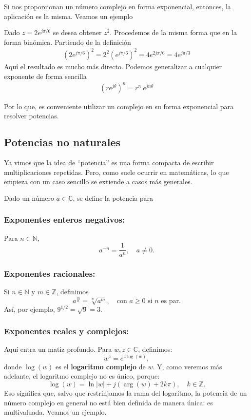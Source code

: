 Si nos proporcionan un número complejo en forma exponencial, entonces, la aplicación es la misma. Veamos un ejemplo
\begin{example}
  Dado $z=2e^{j\pi/6}$ se desea obtener $z^2$. Procedemos de la misma forma que en la forma binómica. Partiendo de la definición
  \begin{align*}
    (2e^{j\pi/6})^2 = 2^2 (e^{j\pi/6})^2 = 4 e^{2j\pi/6} = 4 e^{j\pi/3}
  \end{align*}
  Aquí el resultado es mucho más directo. Podemos generalizar a cualquier exponente de forma sencilla
  \begin{align*}
    (re^{j\theta})^n = r^n ~ e^{jn\theta}
  \end{align*}
\end{example}
Por lo que, es conveniente utilizar un complejo en su forma exponencial para resolver potencias.

\subsection{Potencias no naturales}

Ya vimos que la idea de ``potencia'' es una forma compacta de escribir multiplicaciones repetidas. Pero, como suele ocurrir en matemáticas, lo que empieza con un caso sencillo se extiende a casos más generales. 

Dado un número $a\in\mathbb{C}$, se define la potencia para

\subsubsection{Exponentes enteros negativos:}
Para \(n \in \mathbb{N}\),
\[
a^{-n} = \frac{1}{a^n}, \quad a \neq 0.
\]

\subsubsection{Exponentes racionales:}
Si \(n \in \mathbb{N}\) y \(m \in \mathbb{Z}\), definimos
\[
a^{\tfrac{m}{n}} = \sqrt[n]{a^m}, \quad \text{con } a \geq 0 \text{ si } n \text{ es par}.
\]
Así, por ejemplo, \(9^{1/2} = \sqrt{9} = 3\).

\subsubsection{Exponentes reales y complejos:}

Aquí entra un matiz profundo. Para \(w,z \in \mathbb{C}\), definimos:
\[
w^z = e^{z  \log(w)},
\]
donde \(\log(w)\) es el \textbf{logaritmo complejo} de \(w\). Y, como veremos más adelante, el logaritmo complejo no es único, porque:
\[
\log(w) = \ln|w| + j(\arg(w) + 2k\pi), \quad k \in \mathbb{Z}.
\]
Eso significa que, salvo que restrinjamos la rama del logaritmo, la potencia de un número complejo en general no está bien definida de manera única: es multivaluada. Veamos un ejemplo.

